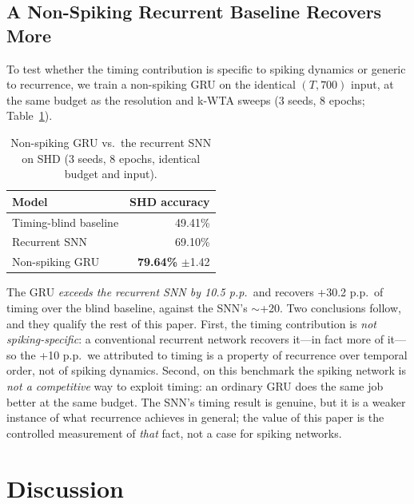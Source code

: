 \documentclass[11pt]{article}
\begin{document}
\subsection{A Non-Spiking Recurrent Baseline Recovers More}
\label{subsec:gru}
To test whether the timing contribution is specific to spiking dynamics or generic to recurrence, we train a non-spiking GRU on the identical $(T,700)$ input, at the same budget as the resolution and k-WTA sweeps (3 seeds, 8 epochs; Table~\ref{tab:gru}).

\begin{table}[tbp]
\centering\small
\caption{Non-spiking GRU vs.\ the recurrent SNN on SHD (3 seeds, 8 epochs, identical budget and input).}
\label{tab:gru}
\begin{tabular}{lr}
\toprule
Model & SHD accuracy \\
\midrule
Timing-blind baseline & 49.41\% \\
Recurrent SNN & 69.10\% \\
Non-spiking GRU & \textbf{79.64\%} $\pm$1.42 \\
\bottomrule
\end{tabular}
\end{table}

The GRU \emph{exceeds the recurrent SNN by 10.5 p.p.}\ and recovers +30.2 p.p.\ of timing over the blind baseline, against the SNN's $\sim$+20. Two conclusions follow, and they qualify the rest of this paper. First, the timing contribution is \emph{not spiking-specific}: a conventional recurrent network recovers it---in fact more of it---so the +10 p.p.\ we attributed to timing is a property of recurrence over temporal order, not of spiking dynamics. Second, on this benchmark the spiking network is \emph{not a competitive} way to exploit timing: an ordinary GRU does the same job better at the same budget. The SNN's timing result is genuine, but it is a weaker instance of what recurrence achieves in general; the value of this paper is the controlled measurement of \emph{that} fact, not a case for spiking networks.

\section{Discussion}
\label{sec:discussion}
\end{document}
